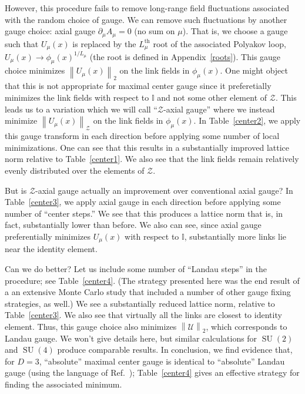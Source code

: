 \documentclass[preprint,aps,prd]{revtex4-2}
\newcommand{\zentrum}{\mathcal{Z}}       %
\newcommand{\config}{\mathcal{U}}
\DeclareMathOperator{\SU}{SU}
\begin{document}
However, this procedure fails to remove long-range field fluctuations
associated with the random choice of gauge.  We can remove
such fluctuations by another gauge choice:  axial gauge
$\partial_\mu A_\mu = 0$ (no sum on $\mu$).
That is, we choose a gauge such that $U_\mu(x)$ is replaced
by the $L_\mu^\mathrm{th}$ root of the associated Polyakov loop,
$U_\mu(x) \to \phi_\mu(x)^{1/L_\mu}$ (the root is defined in
Appendix~\ref{roots}).
This gauge choice minimizes $\left\lVert U_\mu(x) \right\rVert_2$
on the link fields in $\phi_\mu(x)$.  One might
object that this is not appropriate for maximal center gauge
since it preferetially minimizes the link fields
with respect to $\mathbb{I}$ and not some other element of $\zentrum$.
This leads us to a variation which we will call ``$\zentrum$-axial gauge''
where we instead minimize $\left\lVert U_\mu(x) \right\rVert_\zentrum$
on the link fields in $\phi_\mu(x)$.  In Table~\ref{center2},
we apply this gauge transform in each direction before applying
some number of local minimizations.  One can see that this
results in a substantially improved lattice norm relative to
Table~\ref{center1}.  We also see that the link fields
remain relatively evenly distributed over the elements of $\zentrum$.

But is $\zentrum$-axial gauge actually an improvement over
conventional axial gauge?
In Table~\ref{center3}, we apply axial gauge in each
direction before applying some number of ``center steps.''
We see that this produces a lattice norm that is, in fact,
substantially lower than before.  We also can see, since
axial gauge preferentially minimizes $U_\mu(x)$ with
respect to $\mathbb{I}$, substantially more links lie near
the identity element.

Can we do better? Let us include some number of ``Landau steps''
in the procedure; see Table~\ref{center4}.  (The strategy presented
here was the end result of a an extensive Monte Carlo study that
included a number of other gauge fixing strategies, as well.)
We see a substantially reduced lattice norm, relative to
Table~\ref{center3}.  We also see that virtually all the
links are closest to identity element.  Thus, this gauge
choice also minimizes $\left\lVert \config \right\rVert_2$,
which corresponds to Landau gauge.
We won't give details here, but similar calculations for
$\SU(2)$ and $\SU(4)$ produce comparable results.
In conclusion, we find evidence that, for $D=3$,
``absolute'' maximal center gauge is identical to ``absolute''
Landau gauge (using the language of Ref.~\cite{maas_more_2009});
Table~\ref{center4} gives
an effective strategy for finding the associated minimum.
\end{document}
